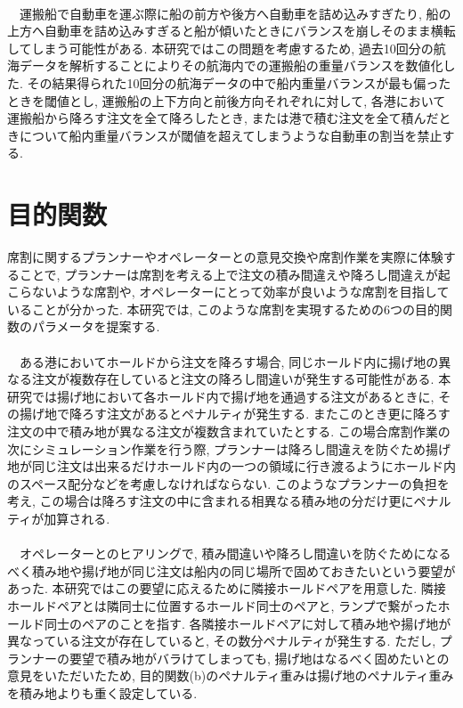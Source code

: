  \\
　運搬船で自動車を運ぶ際に船の前方や後方へ自動車を詰め込みすぎたり, 船の上方へ自動車を詰め込みすぎると船が傾いたときにバランスを崩しそのまま横転してしまう可能性がある\cite{balance}. 本研究ではこの問題を考慮するため, 過去10回分の航海データを解析することによりその航海内での運搬船の重量バランスを数値化した. その結果得られた10回分の航海データの中で船内重量バランスが最も偏ったときを閾値とし, 運搬船の上下方向と前後方向それぞれに対して, 各港において運搬船から降ろす注文を全て降ろしたとき, または港で積む注文を全て積んだときについて船内重量バランスが閾値を超えてしまうような自動車の割当を禁止する.

\section{目的関数}
席割に関するプランナーやオペレーターとの意見交換や席割作業を実際に体験することで, プランナーは席割を考える上で注文の積み間違えや降ろし間違えが起こらないような席割や, オペレーターにとって効率が良いような席割を目指していることが分かった. 本研究では, このような席割を実現するための6つの目的関数のパラメータを提案する. \\

 \\
　ある港においてホールドから注文を降ろす場合, 同じホールド内に揚げ地の異なる注文が複数存在していると注文の降ろし間違いが発生する可能性がある. 本研究では揚げ地において各ホールド内で揚げ地を通過する注文があるときに, その揚げ地で降ろす注文があるとペナルティが発生する.  またこのとき更に降ろす注文の中で積み地が異なる注文が複数含まれていたとする. この場合席割作業の次にシミュレーション作業を行う際, プランナーは降ろし間違えを防ぐため揚げ地が同じ注文は出来るだけホールド内の一つの領域に行き渡るようにホールド内のスペース配分などを考慮しなければならない. このようなプランナーの負担を考え, この場合は降ろす注文の中に含まれる相異なる積み地の分だけ更にペナルティが加算される. \\


 \\
　オペレーターとのヒアリングで, 積み間違いや降ろし間違いを防ぐためになるべく積み地や揚げ地が同じ注文は船内の同じ場所で固めておきたいという要望があった. 本研究ではこの要望に応えるために隣接ホールドペアを用意した. 隣接ホールドペアとは隣同士に位置するホールド同士のペアと, ランプで繋がったホールド同士のペアのことを指す. 各隣接ホールドペアに対して積み地や揚げ地が異なっている注文が存在していると, その数分ペナルティが発生する. ただし, プランナーの要望で積み地がバラけてしまっても, 揚げ地はなるべく固めたいとの意見をいただいたため, 目的関数(b)のペナルティ重みは揚げ地のペナルティ重みを積み地よりも重く設定している. \\

